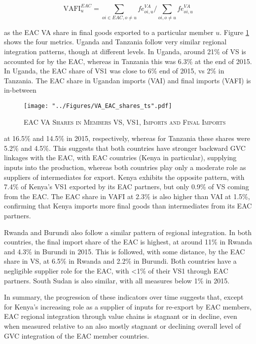\documentclass[a4paper]{article}
\begin{document}
\begin{equation}
\text{VAFI}_{u}^{EAC} = \sum_{oi \in EAC, o \neq u}  fe_{oi, u}^{VA}  \bigg/ \sum_{oi, o \neq u}  fe_{oi, u}^{VA}
\end{equation}

\noindent as the EAC VA share in final goods exported to a particular member $u$. Figure \ref{fig:VAEACshares} shows the four metrics. Uganda and Tanzania follow very similar regional integration patterns, though at different levels. In Uganda, around 21\% of VS is accounted for by the EAC, whereas in Tanzania this was 6.3\% at the end of 2015. In Uganda, the EAC share of VS1 was close to 6\% end of 2015, vs 2\% in Tanzania. The EAC share in Ugandan imports (VAI) and final imports (VAFI) is in-between

\begin{figure}[h!]
\centering
\caption{\label{fig:VAEACshares}\textsc{EAC VA Shares in Members VS, VS1, Imports and Final Imports}}
\texttt{[image: "../Figures/VA\_EAC\_shares\_ts".pdf]} %
\end{figure}
\FloatBarrier

\noindent at 16.5\% and 14.5\% in 2015, respectively, whereas for Tanzania these shares were 5.2\% and 4.5\%. This suggests that both countries have stronger backward GVC linkages with the EAC, with EAC countries (Kenya in particular), supplying inputs into the production, whereas both countries play only a moderate role as suppliers of intermediates for export. Kenya exhibits the opposite pattern, with 7.4\% of Kenya's VS1 exported by its EAC partners, but only 0.9\% of VS coming from the EAC. The EAC share in VAFI at 2.3\% is also higher than VAI at 1.5\%, confirming that Kenya imports more final goods than intermediates from its EAC partners. \newline

Rwanda and Burundi also follow a similar pattern of regional integration. In both countries, the final import share of the EAC is highest, at around 11\% in Rwanda and 4.3\% in Burundi in 2015. This is followed, with some distance, by the EAC share in VS, at 6.5\% in Rwanda and 2.2\% in Burundi. Both countries have a negligible supplier role for the EAC, with <1\% of their VS1 through EAC partners. South Sudan is also similar, with all measures below 1\% in 2015. \newline %
 
 In summary, the progression of these indicators over time suggests that, except for Kenya's increasing role as a supplier of inputs for re-export by EAC members, EAC regional integration through value chains is stagnant or in decline, even when measured relative to an also mostly stagnant or declining overall level of GVC integration of the EAC member countries. 
\end{document}
